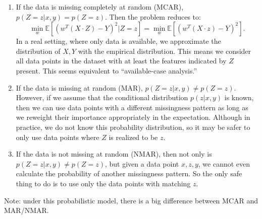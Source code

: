 \documentclass{article}
\begin{document}
\begin{enumerate}

\item If the data is missing completely at random (MCAR), $p(Z=z|x,y)=p(Z=z)$. Then the problem reduces to:
\[
\min_w \mathbb{E}\left[(w^T(X\cdot Z)-Y)^2|Z=z\right] = \min_w \mathbb{E}\left[(w^T(X\cdot z)-Y)^2\right].
\]
In a real setting, where only data is available, we approximate the distribution of $X, Y$ with the empirical distribution. This means we consider all data points in the dataset with at least the features indicated by $Z$ present. This seems equivalent to ``available-case analysis.''

\item If the data is missing at random (MAR), $p(Z=z|x,y)\neq p(Z=z)$. However, if we assume that the conditional distribution $p(z|x,y)$ is known, then we can use data points with a different missingness pattern as long as we reweight their importance appropriately in the expectation. Although in practice, we do not know this probability distribution, so it may be safer to only use data points where $Z$ is realized to be $z$.

\item If the data is not missing at random (NMAR), then not only is $p(Z=z|x,y)\neq p(Z=z)$, but given a data point $x, z, y$, we cannot even calculate the probability of another missingness pattern. So the only safe thing to do is to use only the data points with matching $z$.

\end{enumerate}

Note: under this probabilistic model, there is a big difference between MCAR and MAR/NMAR.
\end{document}
